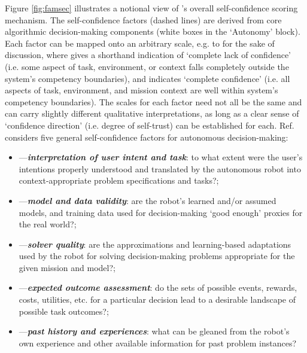 Figure \ref{fig:famsec} illustrates a notional view of \famsec's overall self-confidence scoring mechanism. The self-confidence factors (dashed lines) are derived from core algorithmic decision-making components (white boxes in the `Autonomy' block).  
Each factor \xind{} can be mapped onto an arbitrary scale, e.g. \flow{} to \fup{} for the sake of discussion, where \flow{} gives a shorthand indication of `complete lack of confidence' (i.e. some aspect of task, environment, or context falls completely outside the system's competency boundaries), and \fup{} indicates `complete confidence' (i.e. all aspects of task, environment, and mission context are well within system's competency boundaries). 
The scales for each factor need not all be the same and can carry slightly different qualitative interpretations, as long as a clear sense of `confidence direction' (i.e. degree of self-trust) can be established for each. Ref. \cite{Aitken2016-cv} considers five general self-confidence factors for autonomous decision-making: %
\begin{itemize}
    \item \xI---\textit{\textbf{interpretation of user intent and task}}: to what extent were the user's intentions properly understood and translated by the autonomous robot into context-appropriate problem specifications and tasks?; 
    \item \xM---\textit{\textbf{model and data validity}}: are the robot's learned and/or assumed models, and training data used for decision-making `good enough' proxies for the real world?; 
    \item \xQ---\textit{\textbf{solver quality}}: are the approximations and learning-based adaptations used by the robot for solving decision-making problems appropriate for the given mission and model?; 
    \item \xO---\textit{\textbf{expected outcome assessment}}: do the sets of possible events, rewards, costs, utilities, etc. for a particular decision lead to a desirable landscape of possible task outcomes?; 
    \item \xP---\textit{\textbf{past history and experiences}}: what can be gleaned from the robot's own experience and other available information for past problem instances? %
\end{itemize}

